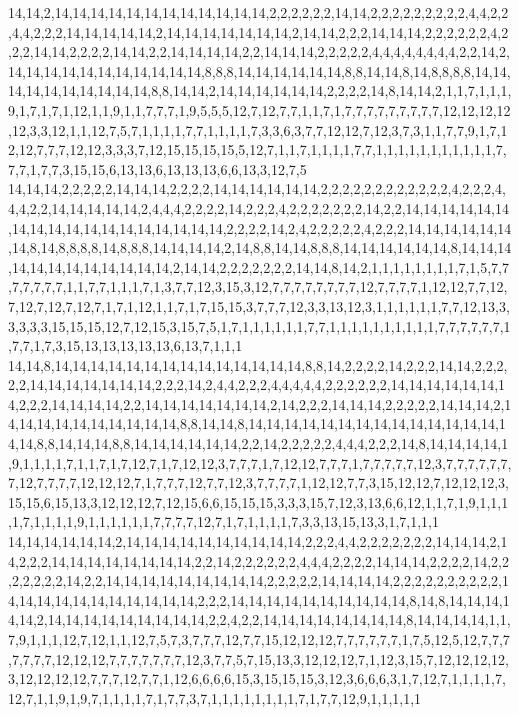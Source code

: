 14,14,2,14,14,14,14,14,14,14,14,14,14,14,14,2,2,2,2,2,2,14,14,2,2,2,2,2,2,2,2,2,4,4,2,2,4,4,2,2,2,14,14,14,14,14,2,14,14,14,14,14,14,14,2,14,14,2,2,2,14,14,14,2,2,2,2,2,2,4,2,2,2,14,14,2,2,2,2,14,14,2,2,14,14,14,14,2,2,14,14,14,2,2,2,2,2,4,4,4,4,4,4,4,4,2,2,14,2,14,14,14,14,14,14,14,14,14,14,14,8,8,8,14,14,14,14,14,14,8,8,14,14,8,14,8,8,8,8,14,14,14,14,14,14,14,14,14,14,8,8,14,14,2,14,14,14,14,14,14,2,2,2,2,14,8,14,14,2,1,1,7,1,1,1,9,1,7,1,7,1,12,1,1,9,1,1,7,7,7,1,9,5,5,5,12,7,12,7,7,1,1,7,1,7,7,7,7,7,7,7,7,7,12,12,12,12,12,3,3,12,1,1,12,7,5,7,1,1,1,1,7,7,1,1,1,1,7,3,3,6,3,7,7,12,12,7,12,3,7,3,1,1,7,7,9,1,7,12,12,7,7,7,12,12,3,3,3,7,12,15,15,15,15,5,12,7,1,1,7,1,1,1,1,7,7,1,1,1,1,1,1,1,1,1,1,1,7,7,7,1,7,7,3,15,15,6,13,13,6,13,13,13,6,6,13,3,12,7,5
14,14,14,2,2,2,2,2,14,14,14,2,2,2,2,14,14,14,14,14,14,2,2,2,2,2,2,2,2,2,2,2,2,4,2,2,2,4,4,4,2,2,14,14,14,14,14,2,4,4,4,2,2,2,2,14,2,2,2,4,2,2,2,2,2,2,2,14,2,2,14,14,14,14,14,14,14,14,14,14,14,14,14,14,14,14,14,14,2,2,2,2,14,2,4,2,2,2,2,2,4,2,2,2,14,14,14,14,14,14,14,8,14,8,8,8,8,14,8,8,8,14,14,14,14,2,14,8,8,14,14,8,8,8,14,14,14,14,14,14,8,14,14,14,14,14,14,14,14,14,14,14,14,2,14,14,2,2,2,2,2,2,2,14,14,8,14,2,1,1,1,1,1,1,1,1,7,1,5,7,7,7,7,7,7,7,1,1,7,7,1,1,1,7,1,3,7,7,12,3,15,3,12,7,7,7,7,7,7,7,7,12,7,7,7,7,1,12,12,7,7,12,7,12,7,12,7,12,7,1,7,1,12,1,1,7,1,7,15,15,3,7,7,7,12,3,3,13,12,3,1,1,1,1,1,1,7,7,12,13,3,3,3,3,3,15,15,15,12,7,12,15,3,15,7,5,1,7,1,1,1,1,1,1,7,7,1,1,1,1,1,1,1,1,1,1,7,7,7,7,7,7,1,7,7,1,7,3,15,13,13,13,13,13,6,13,7,1,1,1
14,14,8,14,14,14,14,14,14,14,14,14,14,14,14,14,14,8,8,14,2,2,2,2,14,2,2,2,14,14,2,2,2,2,2,14,14,14,14,14,14,14,2,2,2,14,2,4,4,2,2,2,4,4,4,4,4,2,2,2,2,2,2,14,14,14,14,14,14,14,2,2,2,14,14,14,14,2,2,14,14,14,14,14,14,14,2,14,2,2,2,14,14,14,2,2,2,2,2,14,14,14,2,14,14,14,14,14,14,14,14,14,14,8,8,14,14,8,14,14,14,14,14,14,14,14,14,14,14,14,14,14,14,14,8,8,14,14,14,8,8,14,14,14,14,14,14,2,2,14,2,2,2,2,2,4,4,4,2,2,2,14,8,14,14,14,14,1,9,1,1,1,1,7,1,1,7,1,7,12,7,1,7,12,12,3,7,7,7,1,7,12,12,7,7,7,1,7,7,7,7,7,12,3,7,7,7,7,7,7,7,12,7,7,7,7,12,12,12,7,1,7,7,7,12,7,7,12,3,7,7,7,7,1,12,12,7,7,3,15,12,12,7,12,12,12,3,15,15,6,15,13,3,12,12,12,7,12,15,6,6,15,15,15,3,3,3,15,7,12,3,13,6,6,12,1,1,7,1,9,1,1,1,1,7,1,1,1,1,9,1,1,1,1,1,1,7,7,7,7,12,7,1,7,1,1,1,1,7,3,3,13,15,13,3,1,7,1,1,1
14,14,14,14,14,14,2,14,14,14,14,14,14,14,14,14,14,2,2,2,4,4,2,2,2,2,2,2,2,14,14,14,2,14,2,2,2,14,14,14,14,14,14,14,14,2,2,14,2,2,2,2,2,2,4,4,4,2,2,2,2,14,14,14,2,2,2,2,14,2,2,2,2,2,2,2,14,2,2,14,14,14,14,14,14,14,14,14,2,2,2,2,2,14,14,14,14,2,2,2,2,2,2,2,2,2,2,14,14,14,14,14,14,14,14,14,14,14,2,2,2,14,14,14,14,14,14,14,14,14,14,8,14,8,14,14,14,14,14,2,14,14,14,14,14,14,14,14,14,2,2,4,2,2,14,14,14,14,14,14,14,14,8,14,14,14,14,1,1,7,9,1,1,1,12,7,12,1,1,12,7,5,7,3,7,7,7,12,7,7,15,12,12,12,7,7,7,7,7,7,1,7,5,12,5,12,7,7,7,7,7,7,7,12,12,12,7,7,7,7,7,7,7,12,3,7,7,5,7,15,13,3,12,12,12,7,1,12,3,15,7,12,12,12,12,3,12,12,12,12,7,7,7,12,7,7,1,12,6,6,6,6,15,3,15,15,15,3,12,3,6,6,6,3,1,7,12,7,1,1,1,1,7,12,7,1,1,9,1,9,7,1,1,1,1,7,1,7,7,3,7,1,1,1,1,1,1,1,1,7,1,7,7,12,9,1,1,1,1,1
